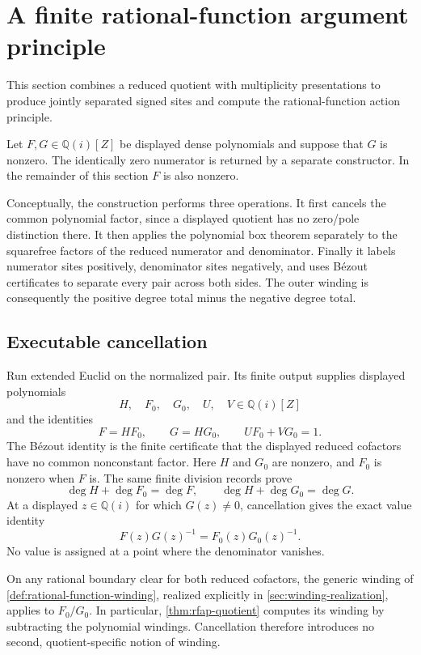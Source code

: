 \documentclass[11pt]{article}
\newcommand{\Qi}{\mathbb{Q}(i)}
\begin{document}
\section{A finite rational-function argument principle}
\label{sec:rfap}

This section combines a reduced quotient with multiplicity presentations to
produce jointly separated signed sites and compute the rational-function
action principle.

Let $F,G\in\Qi[Z]$ be displayed dense polynomials and suppose that $G$ is
nonzero.  The identically zero numerator is returned by a separate
constructor.  In the remainder of this section $F$ is also nonzero.

Conceptually, the construction performs three operations.  It first cancels
the common polynomial factor, since a displayed quotient has no zero/pole
distinction there.  It then applies the polynomial box theorem separately to
the squarefree factors of the reduced numerator and denominator.  Finally it
labels numerator sites positively, denominator sites negatively, and uses
Bézout certificates to separate every pair across both sides.  The outer
winding is consequently the positive degree total minus the negative degree
total.

\subsection{Executable cancellation}

Run extended Euclid on the normalized pair.  Its finite output supplies
displayed polynomials
\[
 H,\quad F_0,\quad G_0,\quad U,\quad V\in\Qi[Z]
\]
and the identities
\begin{equation}
\label{eq:rfap-reduction}
 F=HF_0,\qquad G=HG_0,\qquad UF_0+VG_0=1.
\end{equation}
The Bézout identity is the finite certificate that the displayed reduced
cofactors have no common nonconstant factor.
Here $H$ and $G_0$ are nonzero, and $F_0$ is nonzero when $F$ is.  The same
finite division records prove
\begin{equation}
\label{eq:rfap-degree-balance}
 \deg H+\deg F_0=\deg F,\qquad
 \deg H+\deg G_0=\deg G.
\end{equation}
At a displayed $z\in\Qi$ for which
$G(z)\ne0$, cancellation gives the exact value identity
\[
       F(z)G(z)^{-1}=F_0(z)G_0(z)^{-1}.
\]
No value is assigned at a point where the denominator vanishes.

On any rational boundary clear for both reduced cofactors, the generic
winding of \cref{def:rational-function-winding}, realized explicitly in
\cref{sec:winding-realization}, applies to $F_0/G_0$.  In particular,
\cref{thm:rfap-quotient} computes its winding by subtracting the polynomial
windings.  Cancellation therefore introduces no second, quotient-specific
notion of winding.
\end{document}
